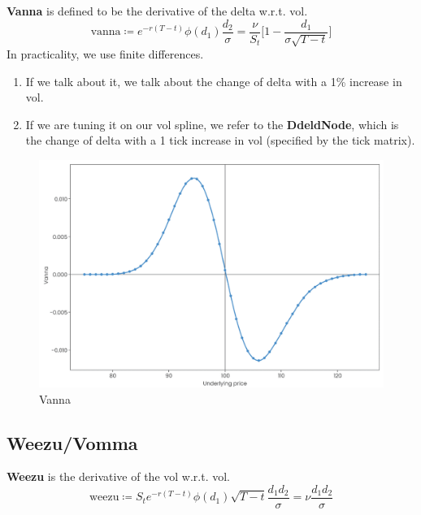 \documentclass{article}
\begin{document}
    \begin{definition}[Vanna]
      \textbf{Vanna} is defined to be the derivative of the delta w.r.t. vol. 
      \begin{equation}
        \text{vanna} \coloneqq e^{-r (T - t)} \phi(d_1) \frac{d_2}{\sigma} = \frac{\nu}{S_t} \bigg[ 1 - \frac{d_1}{\sigma \sqrt{T - t}} \bigg]
      \end{equation}
      In practicality, we use finite differences.  
      \begin{enumerate}
        \item If we talk about it, we talk about the change of delta with a 1\% increase in vol. 
        \item If we are tuning it on our vol spline, we refer to the \textbf{DdeldNode}, which is the change of delta with a 1 tick increase in vol (specified by the tick matrix). 
      \end{enumerate}

      \begin{figure}[H]
        \centering 
        \includegraphics[scale=0.4]{img/vanna.png}
        \caption{Vanna} 
        \label{fig:vanna}
      \end{figure}
    \end{definition}

  \subsection{Weezu/Vomma}

    \begin{definition}
      \textbf{Weezu} is the derivative of the vol w.r.t. vol. 
      \begin{equation}
        \text{weezu} \coloneqq S_t e^{-r (T - t)} \phi(d_1) \sqrt{T - t} \frac{d_1 d_2}{\sigma} = \nu \frac{d_1 d_2}{\sigma}
      \end{equation}
    \end{definition}
\end{document}

